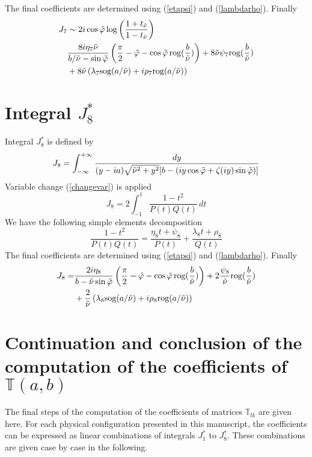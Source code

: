 The final coefficients are determined using (\ref{etapsi}) and (\ref{lambdarho}). Finally
\begin{equation}
\begin{split}
J_7&\sim 2i\cos\tilde{\varphi}\log\left(\frac{1+t_{\tilde{\nu}}}{1-t_{\tilde{\nu}}}\right) \\
&\frac{8i\eta_7\tilde{\nu} }{b/\tilde{\nu}-\sin\tilde{\varphi}}\left(\frac{\pi}{2}-\tilde{\varphi}-\cos\tilde{\varphi} \,\mbox{rog}(\frac{b}{\tilde{\nu}}) \right)+8\tilde{\nu} \psi_7 \mbox{rog}(\frac{b}{\tilde{\nu}} )\\
&+8\tilde{\nu} \left(\lambda_7 \mbox{sog}(a/\tilde{\nu})+i\rho_7 \mbox{rog}(a/\tilde{\nu}) \right)
\end{split}
\label{valJ7}
\end{equation}

\section{Integral $J_8^*$ }
\label{calculJ8}
Integral $J_8^*$ is defined by
\begin{equation}
J_8=\int_{-\infty}^{+\infty}\frac{dy}{(y-ia)\sqrt{\tilde{\nu}^2+y^2}\lbrack b-( iy\cos \tilde{\varphi}+ \zeta(iy)\sin \tilde{\varphi}) \rbrack}
\label{defJ8}
\end{equation}
Variable change (\ref{changevar}) is applied
\begin{equation}
J_8=2 \int_{-1}^{1} \frac{1-t^2}{P(t)Q(t)}\,dt
\end{equation}
We have the following simple elements decomposition
\begin{equation}
\frac{1-t^2}{P(t)Q(t)}=\frac{\eta_8 t+\psi_8}{P(t)}+\frac{\lambda_8 t +\rho_8}{Q(t)}
\end{equation}
The final coefficients are determined using (\ref{etapsi}) and (\ref{lambdarho}). Finally
\begin{equation}
\begin{split}
J_8=&\frac{2i\eta_8 }{b-\tilde{\nu}\sin\tilde{\varphi}}\left(\frac{\pi}{2}-\tilde{\varphi}-\cos\tilde{\varphi} \,\mbox{rog}(\frac{b}{\tilde{\nu}}) \right)+2 \frac{\psi_8}{\tilde{\nu}} \mbox{rog}(\frac{b}{\tilde{\nu}} )\\
&+\frac{2}{\tilde{\nu}} \left(\lambda_8 \mbox{sog}(a/\tilde{\nu})+i\rho_8 \mbox{rog}(a/\tilde{\nu}) \right)
\end{split}
\label{valJ8}
\end{equation}

\section{Continuation and conclusion of the computation of the coefficients of $\mathbb{T}(a,b)$}
\label{fincalculs}
The final steps of the computation of the coefficients of matrices $\mathbb{T}_{lk}$ are given here. For each physical configuration presented in this manuscript, the coefficients can be expressed as linear combinations of integrals $J_1^*$ to $J_8^*$. These combinations are given case by case in the following.

